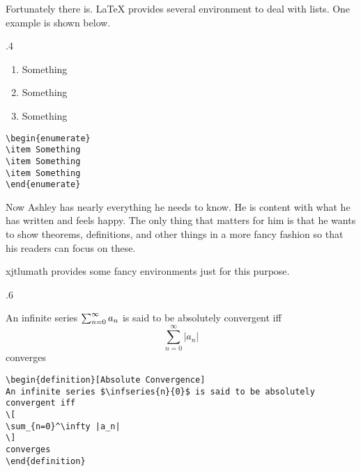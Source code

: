 Fortunately there is. \LaTeX{} provides several environment to deal with lists. One example is shown below.

\begin{miniexammar}{.4\textandmarginlen}{
\begin{enumerate}
\item Something
\item Something
\item Something
\end{enumerate}
}
\begin{lstlisting}
\begin{enumerate}
\item Something
\item Something
\item Something
\end{enumerate}
\end{lstlisting}
\end{miniexammar}

Now Ashley has nearly everything he needs to know. He is content with what he has written and feels happy. The only thing that matters for him is that he wants to show theorems, definitions, and other things in a more fancy fashion so that his readers can focus on these.

xjtlumath provides some fancy environments just for this purpose.

\begin{miniexammar}{.6\textandmarginlen}{
\begin{definition}
An infinite series $\sum_{n=0}^{\infty}{a_{n}}$ is said to be absolutely convergent iff
\[
\sum_{n=0}^\infty |a_n|
\]
converges
\end{definition}
}
\begin{lstlisting}
\begin{definition}[Absolute Convergence]
An infinite series $\infseries{n}{0}$ is said to be absolutely convergent iff
\[
\sum_{n=0}^\infty |a_n|
\]
converges
\end{definition}
\end{lstlisting}
\end{miniexammar}

